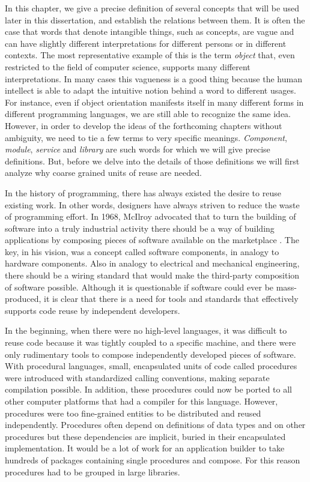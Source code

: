 In this chapter, we give a precise definition of several concepts that will be used later in this dissertation, and
establish the relations between them. It is often the case that words that denote intangible things, such as concepts, are vague
and can have slightly different interpretations for different persons or in different contexts. The most representative example
of this is the term \emph{object} that, even restricted to the field of computer science, supports many different interpretations.
In many cases this vagueness is a good thing because the human intellect is able to adapt the intuitive notion behind a word
to different usages. For instance, even if object orientation manifests itself in many different forms in different programming
languages, we are still able to recognize the same idea. However, in order to develop the ideas of the forthcoming chapters
without ambiguity, we need to tie a few terms to very specific meanings. \emph{Component}, \emph{module}, \emph{service} and
\emph{library} are such words for which we will give precise definitions. But, before we delve into the details of those
definitions we will first analyze why coarse grained units of reuse are needed.

In the history of programming, there has always existed the desire to reuse existing work. In other words, designers have always
striven to reduce the waste of programming effort. In 1968, McIlroy advocated that to turn the building of software into a truly
industrial activity there should be a way of building applications by composing pieces of software available on the marketplace
\cite{McIlroy}. The key, in his vision, was a concept called software components, in analogy to hardware components. Also in
analogy to electrical and mechanical engineering, there should be a wiring standard that would make the third-party composition
of software possible. Although it is questionable if software could ever be mass-produced, it is clear that there is a need for
tools and standards that effectively supports code reuse by independent developers.

In the beginning, when there were no high-level languages, it was difficult to reuse code because it was tightly coupled to a
specific machine, and there were only rudimentary tools to compose independently developed pieces of software.
With procedural languages, small, encapsulated units of code called procedures were introduced with standardized calling
conventions, making separate compilation possible. In addition, these procedures could now be ported to all other computer platforms
that had a compiler for this language. However, procedures were too fine-grained entities to be distributed and reused independently.
Procedures often depend on definitions of data types and on other procedures but these dependencies are implicit, buried in their
encapsulated implementation. It would be a lot of work for an application builder to take hundreds of packages containing single procedures and
compose. For this reason procedures had to be grouped in large libraries.

